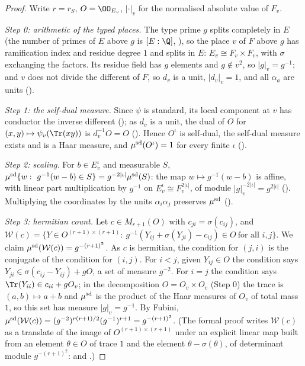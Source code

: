 \begin{proof}
Write $r=r_S$, $O=\OO_{E_v}$, $|\cdot|_v$ for the normalised absolute value of $F_v$.

\emph{Step 0: arithmetic of the typed places.} The type prime $g$ splits completely in $E$ (the number of primes of $E$ above
$g$ is $[E:\Q]$, ), so the place $v$ of $F$ above $g$ has ramification index
and residue degree $1$ and splits in $E$: $E_v\cong F_v\times F_v$, with $\sigma$ exchanging the factors. Its residue field has
$g$ elements and $g\notin v^2$, so $|g|_v=g^{-1}$; and $v$ does not divide the different of $F$, so $d_v$ is a unit, $|d_v|_v=1$,
and all $\alpha_a$ are units ().

\emph{Step 1: the self-dual measure.} Since $\psi$ is standard, its local component at $v$ has conductor the inverse different
(); as $d_v$ is a unit, the dual of $O$ for $(x,y)\mapsto
\psi_v(\Tr(xy))$ is $d_v^{-1}O=O$ (). Hence $O^\iota$ is self-dual, the
self-dual measure exists and is a Haar measure, and $\mu^{\mathrm{sd}}(O^\iota)=1$ for every finite $\iota$
().

\emph{Step 2: scaling.} For $b\in E_v^\iota$ and measurable $S$,
$\mu^{\mathrm{sd}}\{w:\ g^{-1}(w-b)\in S\}=g^{-2|\iota|}\mu^{\mathrm{sd}}(S)$: the map $w\mapsto g^{-1}(w-b)$ is affine, with linear part
multiplication by $g^{-1}$ on $E_v^\iota\cong F_v^{2|\iota|}$, of module $|g|_v^{-2|\iota|}=g^{2|\iota|}$
(). Multiplying the coordinates by the units $\alpha_i\alpha_j$ preserves
$\mu^{\mathrm{sd}}$ ().

\emph{Step 3: hermitian count.} Let $c\in M_{r+1}(O)$ with $c_{ji}=\sigma(c_{ij})$, and
$\mathcal W(c)=\{Y\in O^{(r+1)\times(r+1)}:\ g^{-1}(Y_{ij}+\sigma(Y_{ji})-c_{ij})\in O\ \text{for all }i,j\}$. We claim
$\mu^{\mathrm{sd}}(\mathcal W(c))=g^{-(r+1)^2}$. As $c$ is hermitian, the condition for $(j,i)$ is the conjugate of the condition for
$(i,j)$. For $i<j$, given $Y_{ij}\in O$ the condition says $Y_{ji}\in\sigma(c_{ij}-Y_{ij})+gO$, a set of measure $g^{-2}$. For
$i=j$ the condition says $\Tr(Y_{ii})\in c_{ii}+gO_v$; in the decomposition $O=O_v\times O_v$ (Step 0) the trace is
$(a,b)\mapsto a+b$ and $\mu^{\mathrm{sd}}$ is the product of the Haar measures of $O_v$ of total mass $1$, so this set has measure
$|g|_v=g^{-1}$. By Fubini,
$\mu^{\mathrm{sd}}(\mathcal W(c))=(g^{-2})^{r(r+1)/2}(g^{-1})^{r+1}=g^{-(r+1)^2}$. (The formal proof writes $\mathcal W(c)$ as a
translate of the image of $O^{(r+1)\times(r+1)}$ under an explicit linear map built from an element $\theta\in O$ of trace $1$ and
the element $\theta-\sigma(\theta)$, of determinant module $g^{-(r+1)^2}$:
 and .)


\end{proof}
